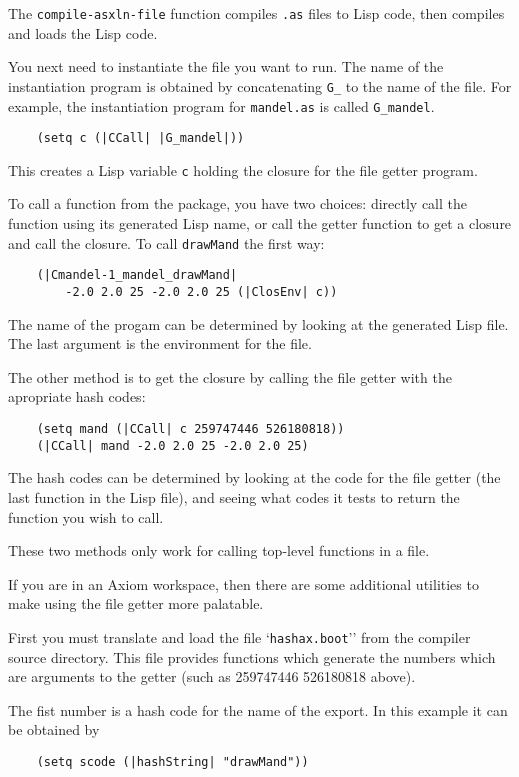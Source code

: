 The {\tt compile-asxln-file} function compiles {\tt .as} files to
Lisp code, then compiles and loads the Lisp code.

You next need to instantiate the file you want to run.
The name of the instantiation program is obtained by concatenating
\verb+G_+ to the name of the file.
For example, the instantiation program for {\tt mandel.as}
is called \verb+G_mandel+.
\begin{verbatim}
    (setq c (|CCall| |G_mandel|))
\end{verbatim}
This creates a Lisp variable {\tt c} holding the closure for the file
getter program.

To call a function from the package, you have two choices: directly call
the function using its generated Lisp name, or call the getter
function to get a closure and call the closure.
To call {\tt drawMand} the first way:
\begin{verbatim}
    (|Cmandel-1_mandel_drawMand|
        -2.0 2.0 25 -2.0 2.0 25 (|ClosEnv| c))
\end{verbatim}

The name of the progam can be determined by looking at the
generated Lisp file.
The last argument is the environment for the file.

The other method is to get the closure by calling the file getter with the
apropriate hash codes:
\begin{verbatim}
    (setq mand (|CCall| c 259747446 526180818))
    (|CCall| mand -2.0 2.0 25 -2.0 2.0 25)
\end{verbatim}

The hash codes can be determined by looking at the code for the
file getter (the last function in the Lisp file), and seeing what
codes it tests to return the function you wish to call.

These two methods only work for calling top-level functions in a file.

If you are in an {\sc Axiom} workspace, then there are some additional 
utilities to make using the file getter more palatable.

First you must translate and load the file `{\tt hashax.boot}'' from the
compiler source directory.  This file provides functions which generate the
numbers which are arguments to the getter (such as 259747446 526180818 above).

The fist number is a hash code for the name of the export. 
In this example it can be obtained by
\begin{verbatim}
    (setq scode (|hashString| "drawMand"))
\end{verbatim}

